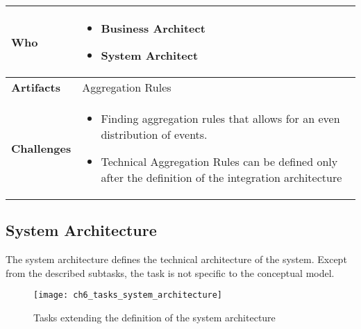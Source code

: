 \begin{tabularx}{\textwidth}{@{} l X @{}}
	\midrule
	\bfseries Who & 
	\begin{itemize}
		\item Business Architect
		\item System Architect
	\end{itemize}
	\\
	\midrule
	\bfseries Artifacts & Aggregation Rules\\
	\midrule
	\bfseries Challenges & 
	\begin{itemize}
		\item Finding aggregation rules that allows for an even distribution of events.
		\item Technical Aggregation Rules can be defined only after the definition of the integration architecture
	\end{itemize}\\
	\bottomrule 
\end{tabularx}

\subsection{System Architecture}

The system architecture defines the technical architecture of the system. Except from the described subtasks, the task is not specific to the conceptual model.

\begin{figure}[htpb] \centering 
	\texttt{[image: ch6\_tasks\_system\_architecture]} 
	\caption{Tasks extending the definition of the system architecture} 
	\label{fig:ch6_tasks_system_architecture} 
\end{figure}

